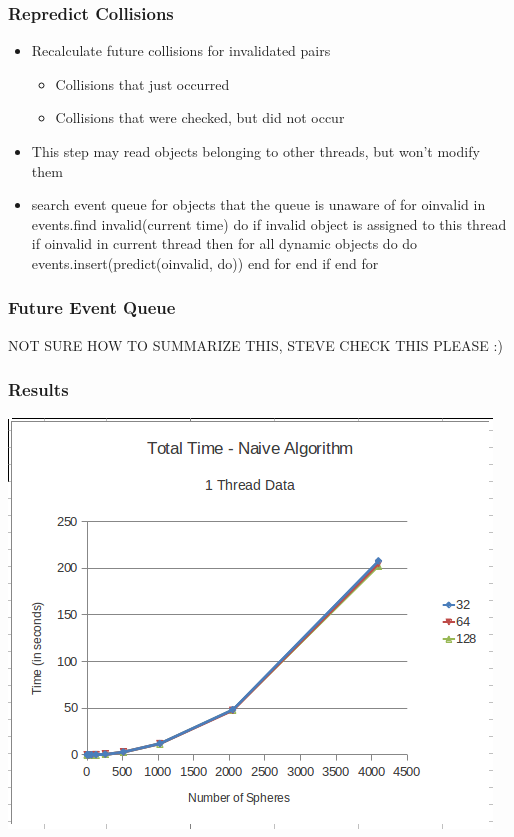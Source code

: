 \documentclass{beamer}
\begin{document}
\begin{frame}
	\frametitle{Repredict Collisions}
	\begin{itemize}
		\item Recalculate future collisions for invalidated pairs
		\begin{itemize}
			\item Collisions that just occurred
			\item Collisions that were checked, but did not occur
		\end{itemize}
		\item This step may read objects belonging to other threads, but won't modify them
		\item
{search event queue for objects that the queue is unaware of}
for oinvalid in events.find invalid(current time) do
  {if invalid object is assigned to this thread}
  if oinvalid in current thread then
    for all dynamic objects do do
      events.insert(predict(oinvalid, do))
    end for
  end if
end for
	\end{itemize}
\end{frame}

\begin{frame}
	\frametitle{Future Event Queue}
	\begin{itemize}
		NOT SURE HOW TO SUMMARIZE THIS, STEVE CHECK THIS PLEASE :)
	\end{itemize}
\end{frame}

\begin{frame}
	\frametitle{Results}
	\begin{center}
		\includegraphics[width=.75\textwidth]{runtime_naive_1thread.png}
	\end{center}
\end{frame}
\end{document}
